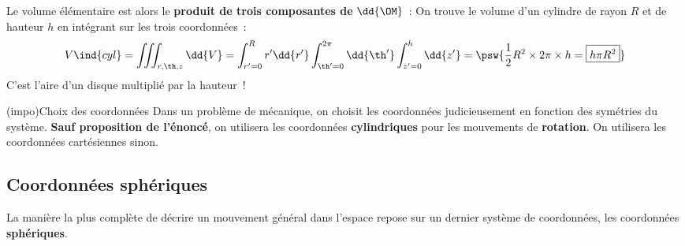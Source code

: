 \documentclass[../../main/main.tex]{subfiles}
\begin{document}
Le volume élémentaire est alors le \textbf{produit de trois composantes de}
$\dd{\OM}$~:
\psw{
	\[
		\boxed{\dd{V} = r \dd{r} \dd{\th} \dd{z}}
	\]
}
On trouve le volume d'un cylindre de rayon $R$ et de hauteur $h$ en
intégrant sur les trois coordonnées~:
\[V\ind{cyl} = \iiint_{r,\th,z} \dd{V} =
	\int_{r'=0}^{R} r'\dd{r'}
	\int_{\th'=0}^{2\pi} \dd{\th'}
	\int_{z'=0}^{h} \dd{z'} =
	\psw{
		\frac{1}{2}R^2\times 2\pi \times h = \boxed{h\pi R^2}
	}
\]
C'est l'aire d'un disque multiplié par la hauteur~!

\begin{tcb*}(impo){Choix des coordonnées}
	Dans un problème de mécanique, on choisit les coordonnées judicieusement en
	fonction des symétries du système. \textbf{Sauf proposition de l'énoncé}, on
	utilisera les coordonnées \textbf{cylindriques} pour les mouvements de
	\textbf{rotation}. On utilisera les coordonnées cartésiennes sinon.
\end{tcb*}

\subsection{Coordonnées sphériques}
La manière la plus complète de décrire un mouvement général dans l'espace repose
sur un dernier système de coordonnées, les coordonnées \textbf{sphériques}.
\end{document}
